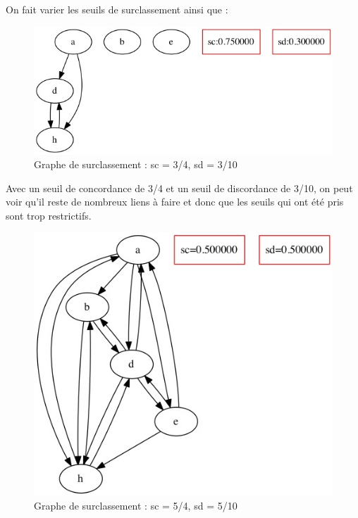 On fait varier les seuils de surclassement ainsi que : \\
\begin{figure}
    \begin{center}
        \includegraphics[scale=0.6]{partie3/graph_3_4_3_10.jpeg}
        \caption{Graphe de surclassement : sc = 3/4, sd = 3/10}
    \end{center}
\end{figure}

Avec un seuil de concordance de 3/4 et un seuil de discordance de 3/10, on peut
voir qu’il reste de nombreux liens à faire et donc que les seuils qui ont été
pris sont trop restrictifs. \\

\begin{figure}
    \begin{center}
        \includegraphics[scale=0.5]{partie3/graph_2_4_5_10.jpeg}
        \caption{Graphe de surclassement : sc = 5/4, sd = 5/10}
    \end{center}
\end{figure}

